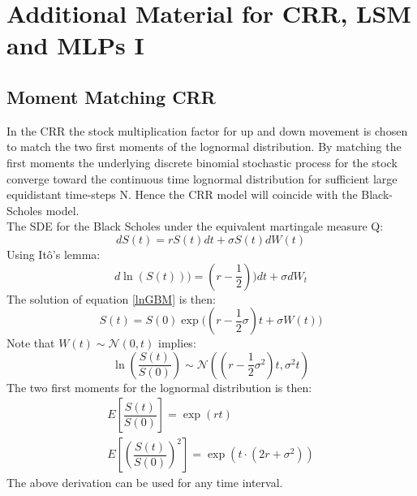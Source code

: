 
\chapter{Additional Material for CRR, LSM and MLPs I} %

\label{AppendixC} %

\section{Moment Matching CRR}\label{CRRMM}
In the CRR the stock multiplication factor for up and down movement is chosen to match the two first moments of the lognormal distribution. By matching the first moments the underlying discrete binomial stochastic process for the stock converge toward the continuous time lognormal distribution for sufficient large equidistant time-steps N. Hence the CRR model will coincide with the Black-Scholes model.\\

The SDE for the Black Scholes under the equivalent martingale measure Q:
$$dS(t)=rS(t)dt + \sigma S(t) dW(t)$$
Using Itô's lemma:
\begin{equation}\label{lnGBM}
d\ln(S(t)))=(r-\frac{1}{2}))dt + \sigma dW_t
\end{equation}
The solution of equation \ref{lnGBM} is then:
$$S(t)=S(0)\exp\bigg((r-\dfrac{1}{2}\sigma)t+ \sigma W(t) \bigg)$$
Note that $W(t)\sim \mathcal{N}(0,t)$ implies:
$$\ln(\dfrac{S(t)}{S(0)}) \sim \mathcal{N}((r-\dfrac{1}{2}\sigma^2)t, \sigma^2 t)$$
The two first moments for the lognormal distribution is then:
\begin{equation}\label{lnMoments}
\begin{split}
E[\dfrac{S(t)}{S(0)}]=\exp(rt)\\
E[(\dfrac{S(t)}{S(0)})^2]=\exp(t\cdot (2r + \sigma^2))
\end{split}
\end{equation}
The above derivation can be used for any time interval.\\

